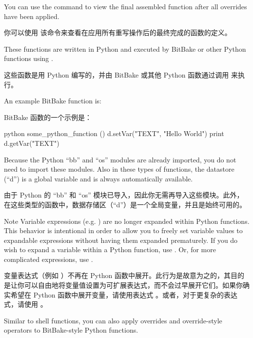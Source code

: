 You can use the  command to view the final assembled function after all overrides have been applied.

你可以使用  该命令来查看在应用所有重写操作后的最终完成的函数的定义。

\label{section:BitBake-Style Python Functions}
These functions are written in Python and executed by BitBake or other Python functions using .

这些函数是用 Python 编写的，并由 BitBake 或其他 Python 函数通过调用  来执行。

An example BitBake function is:

BitBake 函数的一个示例是：

\begin{pyglist}
python some_python_function () {
    d.setVar("TEXT", "Hello World")
    print d.getVar("TEXT")
}
\end{pyglist}

Because the Python ``bb'' and ``os'' modules are already imported, you do not need to import these modules. Also in these types of functions, the datastore (``d'') is a global variable and is always automatically available.

由于 Python 的 ``bb'' 和 ``os'' 模块已导入，因此你无需再导入这些模块。此外，在这些类型的函数中，数据存储区（``d''）是一个全局变量，并且是始终可用的。

\begin{noteblock}{Note}%
Variable expressions (e.g.  ) are no longer expanded within Python functions. This behavior is intentional in order to allow you to freely set variable values to expandable expressions without having them expanded prematurely. If you do wish to expand a variable within a Python function, use  . Or, for more complicated expressions, use .

\medskip
变量表达式（例如 ）不再在 Python 函数中展开。此行为是故意为之的，其目的是让你可以自由地将变量值设置为可扩展表达式，而不会过早展开它们。如果你确实希望在 Python 函数中展开变量，请使用表达式 。或者，对于更复杂的表达式，请使用 。
\end{noteblock}

Similar to shell functions, you can also apply overrides and override-style operators to BitBake-style Python functions.

